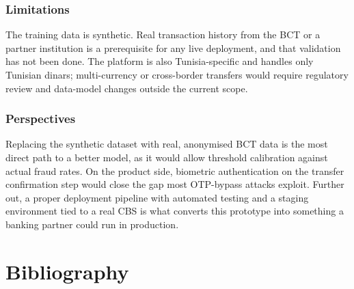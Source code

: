 \documentclass[12pt,a4paper]{report}
\begin{document}
\subsection*{Limitations}

The training data is synthetic. Real transaction history from the BCT or a partner institution
is a prerequisite for any live deployment, and that validation has not been done. The platform
is also Tunisia-specific and handles only Tunisian dinars; multi-currency or cross-border
transfers would require regulatory review and data-model changes outside the current scope.

\subsection*{Perspectives}

Replacing the synthetic dataset with real, anonymised BCT data is the most direct path to a
better model, as it would allow threshold calibration against actual fraud rates. On the
product side, biometric authentication on the transfer confirmation step would close the gap
most OTP-bypass attacks exploit. Further out, a proper deployment pipeline with automated
testing and a staging environment tied to a real CBS is what converts this prototype into
something a banking partner could run in production.

\chapter*{Bibliography}
\end{document}
